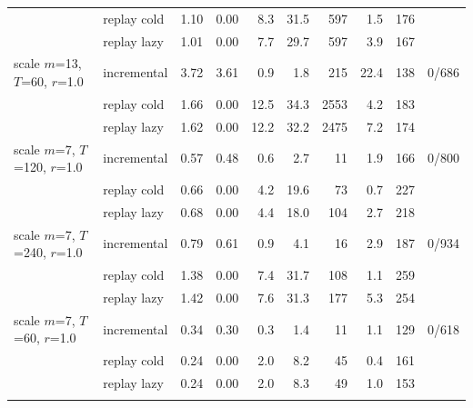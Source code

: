 \begin{table}
\begin{tabular}{llrrrrrrrr}
 & replay cold & 1.10 & 0.00 & 8.3 & 31.5 & 597 & 1.5 & 176 &  \\
 & replay lazy & 1.01 & 0.00 & 7.7 & 29.7 & 597 & 3.9 & 167 &  \\
\addlinespace[2pt]
scale $m$=13, $T$=60, $r$=1.0 & incremental & 3.72 & 3.61 & 0.9 & 1.8 & 215 & 22.4 & 138 & 0/686 \\
 & replay cold & 1.66 & 0.00 & 12.5 & 34.3 & 2553 & 4.2 & 183 &  \\
 & replay lazy & 1.62 & 0.00 & 12.2 & 32.2 & 2475 & 7.2 & 174 &  \\
\addlinespace[2pt]
scale $m$=7, $T$=120, $r$=1.0 & incremental & 0.57 & 0.48 & 0.6 & 2.7 & 11 & 1.9 & 166 & 0/800 \\
 & replay cold & 0.66 & 0.00 & 4.2 & 19.6 & 73 & 0.7 & 227 &  \\
 & replay lazy & 0.68 & 0.00 & 4.4 & 18.0 & 104 & 2.7 & 218 &  \\
\addlinespace[2pt]
scale $m$=7, $T$=240, $r$=1.0 & incremental & 0.79 & 0.61 & 0.9 & 4.1 & 16 & 2.9 & 187 & 0/934 \\
 & replay cold & 1.38 & 0.00 & 7.4 & 31.7 & 108 & 1.1 & 259 &  \\
 & replay lazy & 1.42 & 0.00 & 7.6 & 31.3 & 177 & 5.3 & 254 &  \\
\addlinespace[2pt]
scale $m$=7, $T$=60, $r$=1.0 & incremental & 0.34 & 0.30 & 0.3 & 1.4 & 11 & 1.1 & 129 & 0/618 \\
 & replay cold & 0.24 & 0.00 & 2.0 & 8.2 & 45 & 0.4 & 161 &  \\
 & replay lazy & 0.24 & 0.00 & 2.0 & 8.3 & 49 & 1.0 & 153 &  \\
\addlinespace[2pt]
\bottomrule
\end{tabular}
\end{table}